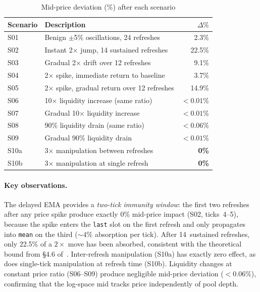 \documentclass[10pt,a4paper,twocolumn]{article}
\theoremstyle{definition}
\theoremstyle{plain}
\theoremstyle{remark}
\begin{document}
\begin{table}[H]
\centering
\small
\caption{Mid-price deviation (\%) after each scenario}
\label{tab:scenario-mid}
\begin{tabularx}{0.95\columnwidth}{@{}l X r@{}}
\toprule
Scenario & Description & $\Delta\%$ \\
\midrule
S01 & Benign $\pm$5\% oscillations, 24 refreshes & 2.3\% \\
S02 & Instant 2$\times$ jump, 14 sustained refreshes & 22.5\% \\
S03 & Gradual 2$\times$ drift over 12 refreshes & 9.1\% \\
S04 & 2$\times$ spike, immediate return to baseline & 3.7\% \\
S05 & 2$\times$ spike, gradual return over 12 refreshes & 14.9\% \\
S06 & 10$\times$ liquidity increase (same ratio) & ${<}0.01$\% \\
S07 & Gradual 10$\times$ liquidity increase & ${<}0.01$\% \\
S08 & 90\% liquidity drain (same ratio) & ${<}0.06$\% \\
S09 & Gradual 90\% liquidity drain & ${<}0.01$\% \\
S10a & 3$\times$ manipulation between refreshes & \textbf{0\%} \\
S10b & 3$\times$ manipulation at single refresh & \textbf{0\%} \\
\bottomrule
\end{tabularx}
\end{table}

\paragraph{Key observations.}
The delayed EMA provides a \emph{two-tick immunity window}: the first two refreshes after any price spike produce exactly 0\% mid-price impact (S02, ticks~4--5), because the spike enters the \texttt{last} slot on the first refresh and only propagates into \texttt{mean} on the third (${\sim}4\%$ absorption per tick). After 14~sustained refreshes, only 22.5\% of a $2\times$ move has been absorbed, consistent with the theoretical bound from \S4.6 of~\cite{wp}. Inter-refresh manipulation (S10a) has exactly zero effect, as does single-tick manipulation at refresh time (S10b). Liquidity changes at constant price ratio (S06--S09) produce negligible mid-price deviation ($<$0.06\%), confirming that the log-space mid tracks price independently of pool depth.
\end{document}
